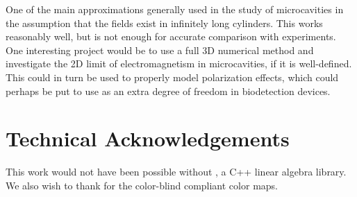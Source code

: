 One of the main approximations generally used in the study of microcavities
in the assumption that the fields exist in infinitely long cylinders. 
This works reasonably well, but is not enough for accurate comparison with 
experiments. One interesting project would be to use a full 3D numerical
method and investigate the 2D limit of electromagnetism in microcavities, 
if it is well-defined. This could in turn be used to properly model 
polarization effects, which could perhaps be put to use as an 
extra degree of freedom in biodetection devices.

\section{Technical Acknowledgements}
This work would not have been possible without \cite{SAN2010}, a C++ linear algebra
library. We also wish to thank \cite{GEI2013} for the color-blind compliant color maps.